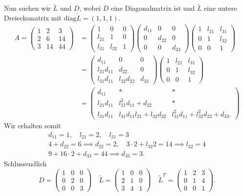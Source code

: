 \documentclass[9pt]{extarticle}
\theoremstyle{named}
\begin{document}
Nun suchen wir $\tilde L$ und $D$, wobei $D$ eine Diagonalmatrix ist und $\tilde L$ eine untere Dreiecksmatrix mit $\mathrm{diag} \tilde L = (1,1,1)$.
\begin{align*}
	A = \begin{pmatrix}1 &2 & 3 \\ 2 & 6 & 14 \\ 3 & 14 & 44\end{pmatrix} &= 
	\begin{pmatrix}
		1 & 0 & 0 \\ l_{21} & 1 & 0 \\ l_{31} & l_{32} &1
	\end{pmatrix}
	\begin{pmatrix}
	d_{11} & 0 & 0 \\ 0 & d_{22} & 0 \\ 0 & 0 & d_{33}
	\end{pmatrix}
	\begin{pmatrix}
	1 & l_{21} & l_{31} \\ 0 & 1 & l_{32} \\ 0 & 0 & 1
	\end{pmatrix}\\
	&= \begin{pmatrix}
		d_{11} & 0 & 0 \\l_{21}d_{11} & d_{22} & 0 \\ l_{31}d_{11} & l_{32}d_{22} & d_{33}
	\end{pmatrix}\begin{pmatrix}
	1 & l_{21} & l_{31} \\ 0 & 1 & l_{32} \\ 0 & 0 & 1
	\end{pmatrix} \\
	&= \begin{pmatrix}
		d_{11} & * & * \\
		l_{21}d_{11} & l_{21}^2d_{11} + d_{22} & * \\
		l_{31}d_{11} & l_{31}d_{11}l_{21} + l_{32}d_{22} & l_{31}^2d_{11} + l_{32}^2d_{22}+d_{33}.
	\end{pmatrix}
\end{align*}
Wir erhalten somit
\begin{gather*}
	d_{11} = 1, \quad l_{21} = 2, \quad l_{31} = 3 \\
	4 + d_{22} = 6 \implies d_{22} = 2, \quad 3 \cdot 2 + l_{32} 2 = 14 \implies l_{32} = 4 \\
	9 + 16 \cdot 2 + d_{33} = 44 \implies d_{33} = 3.
\end{gather*}
Schlussendlich
\[
	D = \begin{pmatrix}
	1 & 0 & 0 \\ 0 & 2 & 0 \\ 0 & 0 & 3
	\end{pmatrix} \quad \tilde L = 
	\begin{pmatrix}
	1 & 0 & 0 \\ 2 & 1 & 0 \\ 3 & 4 & 1
	\end{pmatrix} \quad \tilde L^T = \begin{pmatrix}
		1 & 2 & 3 \\ 0 & 1 & 4 \\ 0 & 0 & 1
	\end{pmatrix}.
\]
\end{document}
